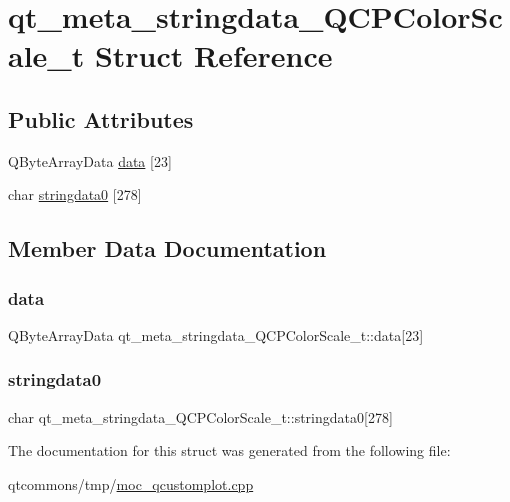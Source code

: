 \hypertarget{structqt__meta__stringdata___q_c_p_color_scale__t}{}\section{qt\+\_\+meta\+\_\+stringdata\+\_\+\+Q\+C\+P\+Color\+Scale\+\_\+t Struct Reference}
\label{structqt__meta__stringdata___q_c_p_color_scale__t}
\subsection*{Public Attributes}
\begin{DoxyCompactItemize}
\item 
Q\+Byte\+Array\+Data \mbox{\hyperlink{structqt__meta__stringdata___q_c_p_color_scale__t_adbfbd7275c982d9d6c70985a35909562}{data}} \mbox{[}23\mbox{]}
\item 
char \mbox{\hyperlink{structqt__meta__stringdata___q_c_p_color_scale__t_a0ed4cd437d62f56ea375637ec624a59c}{stringdata0}} \mbox{[}278\mbox{]}
\end{DoxyCompactItemize}


\subsection{Member Data Documentation}
\mbox{\label{structqt__meta__stringdata___q_c_p_color_scale__t_adbfbd7275c982d9d6c70985a35909562}} 
\subsubsection{\texorpdfstring{data}{data}}
{\footnotesize\ttfamily Q\+Byte\+Array\+Data qt\+\_\+meta\+\_\+stringdata\+\_\+\+Q\+C\+P\+Color\+Scale\+\_\+t\+::data\mbox{[}23\mbox{]}}

\mbox{\label{structqt__meta__stringdata___q_c_p_color_scale__t_a0ed4cd437d62f56ea375637ec624a59c}} 
\subsubsection{\texorpdfstring{stringdata0}{stringdata0}}
{\footnotesize\ttfamily char qt\+\_\+meta\+\_\+stringdata\+\_\+\+Q\+C\+P\+Color\+Scale\+\_\+t\+::stringdata0\mbox{[}278\mbox{]}}



The documentation for this struct was generated from the following file\+:\begin{DoxyCompactItemize}
\item 
qtcommons/tmp/\mbox{\hyperlink{moc__qcustomplot_8cpp}{moc\+\_\+qcustomplot.\+cpp}}\end{DoxyCompactItemize}
